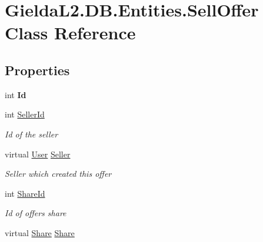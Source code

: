 \hypertarget{class_gielda_l2_1_1_d_b_1_1_entities_1_1_sell_offer}{}\section{Gielda\+L2.\+D\+B.\+Entities.\+Sell\+Offer Class Reference}
\label{class_gielda_l2_1_1_d_b_1_1_entities_1_1_sell_offer}
\subsection*{Properties}
\begin{DoxyCompactItemize}
\item 
\mbox{\label{class_gielda_l2_1_1_d_b_1_1_entities_1_1_sell_offer_a235e1b4c7e31b8fc1925251a2924072e}} 
int {\bfseries Id}
\item 
int \mbox{\hyperlink{class_gielda_l2_1_1_d_b_1_1_entities_1_1_sell_offer_a5ade872100862fa9ca9a7241dccb5dd1}{Seller\+Id}}
\begin{DoxyCompactList}\small\item\em Id of the seller \end{DoxyCompactList}\item 
virtual \mbox{\hyperlink{class_gielda_l2_1_1_d_b_1_1_entities_1_1_user}{User}} \mbox{\hyperlink{class_gielda_l2_1_1_d_b_1_1_entities_1_1_sell_offer_aa1ccf719108f99f5e3b9ed9f3d03cebd}{Seller}}
\begin{DoxyCompactList}\small\item\em Seller which created this offer \end{DoxyCompactList}\item 
int \mbox{\hyperlink{class_gielda_l2_1_1_d_b_1_1_entities_1_1_sell_offer_a0dbcb24e116e87f43cbe07efee92dc34}{Share\+Id}}
\begin{DoxyCompactList}\small\item\em Id of offers share \end{DoxyCompactList}\item 
virtual \mbox{\hyperlink{class_gielda_l2_1_1_d_b_1_1_entities_1_1_share}{Share}} \mbox{\hyperlink{class_gielda_l2_1_1_d_b_1_1_entities_1_1_sell_offer_aff6a20acb0195d70225bb65c49977fa3}{Share}}

\end{DoxyCompactItemize}
